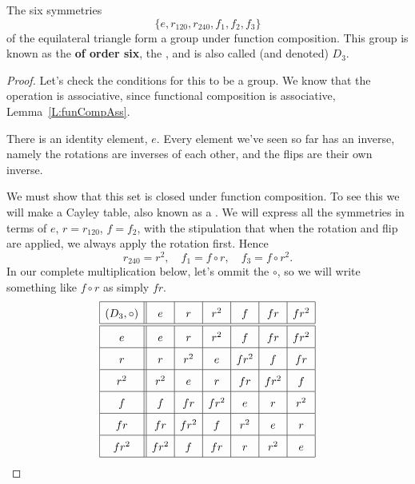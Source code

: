 \documentclass{ximera}
\begin{document}
\begin{theorem}
  The six symmetries
  \[
  \{e,r_{120},r_{240},f_1,f_2,f_3\}
  \]
  of the equilateral triangle form a group under function
  composition. This group is known as the \textbf{
    of order six}, the ,
  and is also called (and denoted) $D_3$.
  \begin{proof}
    Let's check the conditions for this to be a group. We know that
    the operation is associative, since functional composition is
    associative, Lemma~\ref{L:funCompAss}.

    There is an identity element, $e$. Every element we've seen so far
    has an inverse, namely the rotations are inverses of each other,
    and the flips are their own inverse.
    
    We must show that this set is closed under function composition.
    To see this we will make a Cayley table, also known as a
    . We will express all the symmetries in terms of
    $e$, $r=r_{120}$, $f=f_2$, with the stipulation that when the
    rotation and flip are applied, we always apply the rotation
    first. Hence
    \[
    r_{240} = r^2, \quad  f_1 = f\circ r, \quad  f_3 = f\circ r^2.
    \]
    In our complete multiplication below, let's ommit the $\circ$, so
    we will write something like $f\circ r$ as simply $fr$.
    \[
    \renewcommand{\arraystretch}{1.6}
    \begin{array}{|c||c|c|c|c|c|c|}\hline
      (D_3,\circ)& e     & r     & r^2   & f     & f r   & f r^2 \\  \hline\hline
      e          & e     & r     & r^2   & f     & f r   & f r^2 \\  \hline
      r          & r     & r^2   & e     & f r^2 & f     & f r   \\  \hline
      r^2        & r^2   & e     & r     & f r   & f r^2 & f     \\  \hline
      f          & f     & f r   & f r^2 & e     & r     & r^2   \\  \hline
      f r        & f r   & f r^2 & f     & r^2   & e     & r     \\  \hline
      f r^2      & f r^2 & f     & f r   & r     & r^2   & e     \\  \hline
    \end{array}
    \]
  \end{proof}
\end{theorem}
\end{document}
